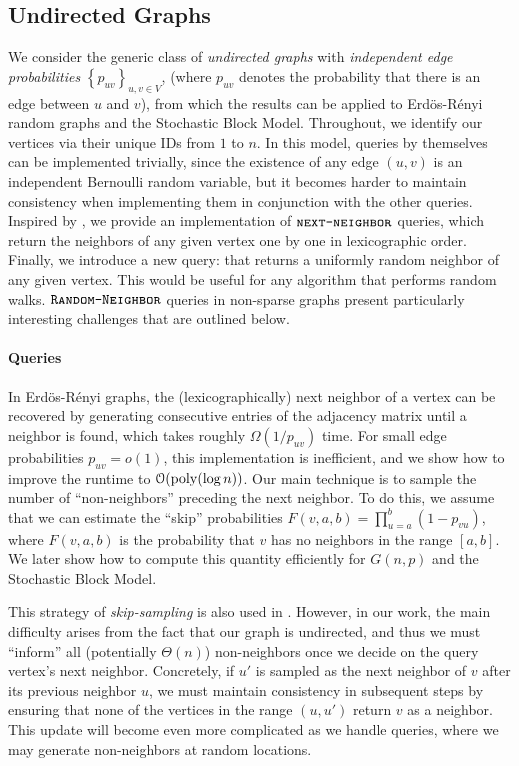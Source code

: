 \subsection{Undirected Graphs}
\label{sec:undirected_graphs}
We consider the generic class of \emph{undirected graphs} with {\em independent edge probabilities} $\left\{ p_{uv} \right\}_{u,v\in V}$,
(where $p_{uv}$ denotes the probability that there is an edge between $u$ and $v$),
from which the results can be applied to Erd\"os-R\'enyi random graphs and the Stochastic Block Model.
Throughout, we identify our vertices via their unique IDs from $1$ to $n$.
In this model,  queries by themselves can be implemented trivially,
since the existence of any edge $(u,v)$ is an independent Bernoulli random variable,
but it becomes harder to maintain consistency when implementing them in conjunction with the other queries.
Inspired by \cite{reut}, we provide an implementation of $\texttt{\textsc{next-neighbor}}$ queries,
which return the neighbors of any given vertex one by one in lexicographic order.
Finally, we introduce a new query:  that returns a uniformly random neighbor of any given vertex.
This would be useful for any algorithm that performs random walks.
$\texttt{\textsc{Random-Neighbor}}$ queries in non-sparse graphs present particularly interesting challenges that are outlined below.

\paragraph*{ Queries}
\label{par:next_neighbor_queries}
In Erd\"os-R\'enyi graphs, the (lexicographically) next neighbor of a vertex can be recovered by generating consecutive entries
of the adjacency matrix until a neighbor is found, which takes roughly $\Omega(1/p_{uv})$ time.
For small edge probabilities $p_{uv} = o(1)$, this implementation is inefficient, and we show how to improve the runtime to $\mathcal O(\mathrm{poly}(\log n))$.
Our main technique is to sample the number of ``non-neighbors'' preceding the next neighbor.
To do this, we assume that we can estimate the ``skip'' probabilities $F(v,a,b)=\prod^{b}_{u=a} (1-p_{vu})$,
where $F(v,a,b)$ is the probability that $v$ has no neighbors in the range $[a,b]$.
We later show how to compute this quantity efficiently for $G(n,p)$ and the Stochastic Block Model.

This strategy of \emph{skip-sampling} is also used in \cite{reut}.
However, in our work, the main difficulty arises from the fact that our graph is undirected,
and thus we must ``inform'' all (potentially $\Theta(n)$) non-neighbors once we decide on the query vertex's next neighbor.
Concretely, if $u'$ is sampled as the next neighbor of $v$ after its previous neighbor $u$,
we must maintain consistency in subsequent steps by ensuring that none of the vertices in the range $(u,u')$ return $v$ as a neighbor.
This update will become even more complicated as we handle  queries, where we may generate non-neighbors at random locations.

